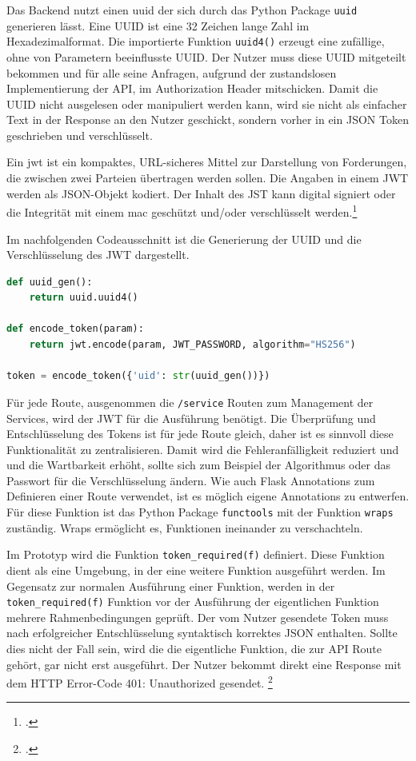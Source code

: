 Das Backend nutzt einen \ac{uuid} der sich durch das Python Package \texttt{uuid} generieren lässt. Eine UUID ist eine 32 Zeichen lange Zahl im Hexadezimalformat. Die importierte Funktion \texttt{uuid4()} erzeugt eine zufällige, ohne von Parametern beeinflusste UUID. Der Nutzer muss diese UUID mitgeteilt bekommen und für alle seine Anfragen, aufgrund der zustandslosen Implementierung der API, im Authorization Header mitschicken. Damit die UUID nicht ausgelesen oder manipuliert werden kann, wird sie nicht als einfacher Text in der Response an den Nutzer geschickt, sondern vorher in ein JSON Token geschrieben und verschlüsselt.

Ein \ac{jwt} ist ein kompaktes, URL-sicheres Mittel zur Darstellung von Forderungen, die zwischen zwei Parteien übertragen werden sollen. Die Angaben in einem JWT werden als JSON-Objekt kodiert. Der Inhalt des JST kann digital signiert oder die Integrität mit einem \ac{mac} geschützt und/oder verschlüsselt werden.\footcite{jones2015json}

Im nachfolgenden Codeausschnitt ist die Generierung der UUID und die Verschlüsselung des JWT dargestellt.
\begin{lstlisting}[language=Python, caption={Generierung der UUID und Erstellung des JWT}]
def uuid_gen():
    return uuid.uuid4()
    
def encode_token(param):
    return jwt.encode(param, JWT_PASSWORD, algorithm="HS256")

token = encode_token({'uid': str(uuid_gen())})
\end{lstlisting}

Für jede Route, ausgenommen die \texttt{/service} Routen zum Management der Services, wird der JWT für die Ausführung benötigt. Die Überprüfung und Entschlüsselung des Tokens ist für jede Route gleich, daher ist es sinnvoll diese Funktionalität zu zentralisieren. Damit wird die Fehleranfälligkeit reduziert und und die Wartbarkeit erhöht, sollte sich zum Beispiel der Algorithmus oder das Passwort für die Verschlüsselung ändern. Wie auch Flask Annotations zum Definieren einer Route verwendet, ist es möglich eigene Annotations zu entwerfen. Für diese Funktion ist das Python Package \texttt{functools} mit der Funktion \texttt{wraps} zuständig. Wraps ermöglicht es, Funktionen ineinander zu verschachteln.

Im Prototyp wird die Funktion \texttt{token\_{}required(f)} definiert. Diese Funktion dient als eine Umgebung, in der eine weitere Funktion ausgeführt werden. Im Gegensatz zur normalen Ausführung einer Funktion, werden in der \texttt{token\_{}required(f)} Funktion vor der Ausführung der eigentlichen Funktion mehrere Rahmenbedingungen geprüft. Der vom Nutzer gesendete Token muss nach erfolgreicher Entschlüsselung syntaktisch korrektes JSON enthalten. Sollte dies nicht der Fall sein, wird die die eigentliche Funktion, die zur API Route gehört, gar nicht erst ausgeführt. Der Nutzer bekommt direkt eine Response mit dem HTTP Error-Code 401: Unauthorized gesendet. \footcite{fielding1999rfc2616}

